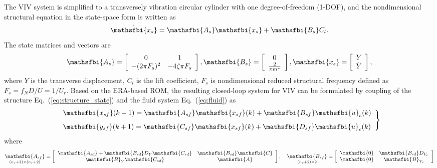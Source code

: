 \documentclass[standard]{jfm}
\begin{document}
The VIV system is simplified to 
a transversely vibration circular cylinder with one degree-of-freedom (1-DOF), and the nondimensional structural equation in the state-space form is written as \citep{Yao2016_JFS}
\begin{equation}
 \dot{\mathsfbi{x_{s}}}=\mathsfbi{A_{s}}\mathsfbi{x_{s}}+\mathsfbi{B_{s}}C_l.
\label{eq:structure_state}
\end{equation} 
The state matrices and vectors are
\[ 
	\mathsfbi{A_{s}}=\left[ \begin{array}{cc}
	0 & 1\\
	 -(2\pi F_{s})^2 &-4\zeta\pi F_{s}      
 	\end{array} \right],
 	\mathsfbi{B_{s}}=\left[ \begin{array}{c}
 	0 \\
 	\frac{2}{\pi m^{*}}
	\end{array}  \right],
	\mathsfbi{x_{s}}=\left[ \begin{array}{c}
 	Y \\
 	\dot{Y}
	\end{array}  \right], 
 \] 
where $Y$ is the transverse displacement, $C_{l}$ is the lift coefficient, 
$F_{s}$ is nondimensional reduced structural frequency 
defined as $F_{s}=f_{N}D/U = 1/U_r$. 
Based on the ERA-based ROM, the resulting closed-loop system for VIV 
can be formulated by coupling  of the structure Eq.~(\ref{eq:structure_state}) 
and the fluid system Eq.~(\ref{eq:fluid}) as  
\begin{equation}
\left. \begin{array}{ll}
\displaystyle \mathsfbi{x_{sf}}(k+1)=\mathsfbi{A_{sf}}\mathsfbi{x_{sf}}(k) 
+ \mathsfbi{B_{sf}} \mathsfbi{u}_c(k) \\[8pt]
\displaystyle \mathsfbi{y_{sf}}(k+1)=\mathsfbi{C_{sf}}\mathsfbi{x_{sf}}(k) 
+ \mathsfbi{D_{sf}} \mathsfbi{u}_c(k)
\end{array}\right\}
 \label{eq:vivrom}
\end{equation}  
where
\[
\underset{(n_r+2) \times (n_r+2)}{\mathsfbi{A_{sf}}}=\left[ \begin{array}{cc}
\mathsfbi{A_{sd}}+\mathsfbi{B_{sd}}D_Y\mathsfbi{C_{sd}} & \mathsfbi{B_{sd}}\mathsfbi{C} \\
\mathsfbi{B}_Y\mathsfbi{C_{sd}} & \mathsfbi{A}
\end{array}  \right], \quad
\underset{(n_r+2) \times 2}{\mathsfbi{B_{sf}}}=\left[ \begin{array}{cc}
\mathsfbi{0} & \mathsfbi{B_{sd}}D_{V_c} \\
\mathsfbi{0} & \mathsfbi{B}_{V_c}
\end{array}  \right] \]
\end{document}
